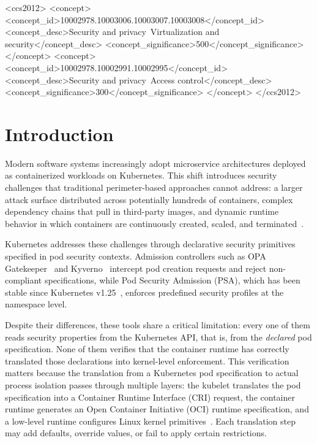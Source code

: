 \documentclass[sigconf]{acmart}
\begin{document}
\begin{CCSXML}
<ccs2012>
 <concept>
  <concept_id>10002978.10003006.10003007.10003008</concept_id>
  <concept_desc>Security and privacy~Virtualization and security</concept_desc>
  <concept_significance>500</concept_significance>
 </concept>
 <concept>
  <concept_id>10002978.10002991.10002995</concept_id>
  <concept_desc>Security and privacy~Access control</concept_desc>
  <concept_significance>300</concept_significance>
 </concept>
</ccs2012>
\end{CCSXML}


\maketitle

\section{Introduction}

Modern software systems increasingly adopt microservice architectures deployed as containerized workloads on Kubernetes. This shift introduces security challenges that traditional perimeter-based approaches cannot address: a larger attack surface distributed across potentially hundreds of containers, complex dependency chains that pull in third-party images, and dynamic runtime behavior in which containers are continuously created, scaled, and terminated~\cite{wong2023, devipriya2023}.

Kubernetes addresses these challenges through declarative security primitives specified in pod security contexts. Admission controllers such as OPA Gatekeeper~\cite{gatekeeper2024} and Kyverno~\cite{kyverno2024} intercept pod creation requests and reject non-compliant specifications, while Pod Security Admission (PSA), which has been stable since Kubernetes v1.25~\cite{k8spsa2022}, enforces predefined security profiles at the namespace level.

Despite their differences, these tools share a critical limitation: every one of them reads security properties from the Kubernetes API, that is, from the \emph{declared} pod specification. None of them verifies that the container runtime has correctly translated those declarations into kernel-level enforcement. This verification matters because the translation from a Kubernetes pod specification to actual process isolation passes through multiple layers: the kubelet translates the pod specification into a Container Runtime Interface (CRI) request, the container runtime generates an Open Container Initiative (OCI) runtime specification, and a low-level runtime configures Linux kernel primitives~\cite{k8sseccomp2024}. Each translation step may add defaults, override values, or fail to apply certain restrictions.
\end{document}
